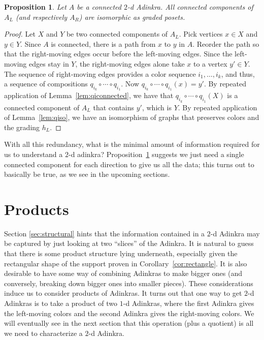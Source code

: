 \documentclass[12pt,twoside,singlespace]{article}
\numberwithin{equation}{section}
\newtheorem{prop}[equation]{Proposition}
\theoremstyle{definition}
\begin{document}
\begin{prop}
\label{prop:kevin}
Let $A$ be a connected $2$-d Adinkra.  All connected components of $A_L$ (and respectively $A_R$) are isomorphic as graded posets.
\end{prop}
\begin{proof}
Let $X$ and $Y$ be two connected components of $A_L$. Pick vertices $x \in X$ and $y \in Y$. Since $A$ is connected, there is a path from $x$ to $y$ in $A$. Reorder the path so that the right-moving edges occur before the left-moving edges. Since the left-moving edges stay in $Y$, the right-moving edges alone take $x$ to a vertex $y' \in Y$.  The sequence of right-moving edges provides a color sequence $i_1,\ldots,i_k$, and thus, a sequence of compositions $q_{i_k}\circ\cdots\circ q_{i_1}$.  Now $q_{i_k}\circ\cdots\circ q_{i_1}(x)=y'$.  By repeated application of Lemma~\ref{lem:qiconnected}, we have that $q_{i_k}\circ\cdots\circ q_{i_1}(X)$ is a connected component of $A_L$ that contains $y'$, which is $Y$.  By repeated application of Lemma~\ref{lem:qiso}, we have an isomorphism of graphs that preserves colors and the grading $h_L$.
\end{proof}

With all this redundancy, what is the minimal amount of information required for us to understand a $2$-d adinkra? Proposition~\ref{prop:kevin} suggests we just need a single connected component for each direction to give us all the data; this turns out to basically be true, as we see in the upcoming sections.

\section{Products}
\label{sec:products}

Section \ref{sec:structural} hints that the information contained in a $2$-d Adinkra may be captured by just looking at two ``slices'' of the Adinkra. It is natural to guess that there is some product structure lying underneath, especially given the rectangular shape of the support proven in Corollary~\ref{cor:rectangle}. It is also desirable to have some way of combining Adinkras to make bigger ones (and conversely, breaking down bigger ones into smaller pieces). These considerations induce us to consider products of Adinkras. It turns out that one way to get $2$-d Adinkras is to take a product of two $1$-d Adinkras, where the first Adinkra gives the left-moving colors and the second Adinkra gives the right-moving colors. We will eventually see in the next section that this operation (plus a quotient) is all we need to characterize a $2$-d Adinkra.
\end{document}
